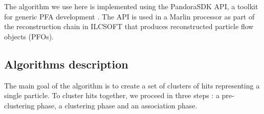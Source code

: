 \documentclass[cits]{JINST}
\begin{document}
The algorithm we use here is implemented using the PandoraSDK API, a toolkit for generic PFA development \cite{pandora-sdk}. The API is used in a Marlin \cite{marlin-lccd}  processor as part of the reconstruction chain in ILCSOFT \cite{ilcsoft} that produces reconstructed particle flow objects (PFOs). 

\subsection{Algorithms description}

The main goal of the algorithm is to create a set of clusters of hits representing a single particle. To cluster hits together, we proceed in three steps : a pre-clustering phase, a clustering phase and an association phase.
\end{document}
